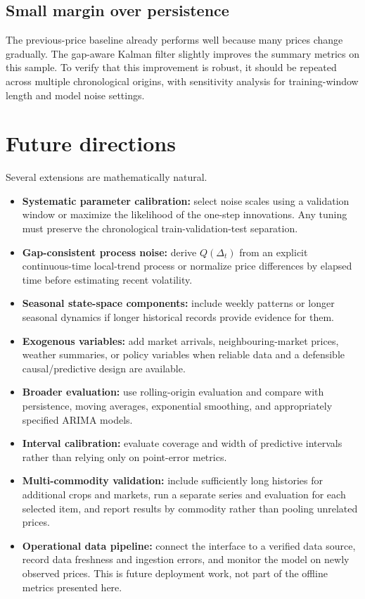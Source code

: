 \documentclass[12pt,a4paper,oneside]{report}
\numberwithin{equation}{chapter}
\numberwithin{figure}{chapter}
\numberwithin{table}{chapter}
\theoremstyle{definition}
\theoremstyle{plain}
\newcommand{\1}{\mathbf{1}}
\begin{document}
\subsection{Small margin over persistence}
The previous-price baseline already performs well because many prices change gradually. The gap-aware Kalman filter slightly improves the summary metrics on this sample. To verify that this improvement is robust, it should be repeated across multiple chronological origins, with sensitivity analysis for training-window length and model noise settings.

\section{Future directions}
Several extensions are mathematically natural.
\begin{itemize}
  \item \textbf{Systematic parameter calibration:} select noise scales using a validation window or maximize the likelihood of the one-step innovations. Any tuning must preserve the chronological train-validation-test separation.
  \item \textbf{Gap-consistent process noise:} derive $Q(\Delta_t)$ from an explicit continuous-time local-trend process or normalize price differences by elapsed time before estimating recent volatility.
  \item \textbf{Seasonal state-space components:} include weekly patterns or longer seasonal dynamics if longer historical records provide evidence for them.
  \item \textbf{Exogenous variables:} add market arrivals, neighbouring-market prices, weather summaries, or policy variables when reliable data and a defensible causal/predictive design are available.
  \item \textbf{Broader evaluation:} use rolling-origin evaluation and compare with persistence, moving averages, exponential smoothing, and appropriately specified ARIMA models.
  \item \textbf{Interval calibration:} evaluate coverage and width of predictive intervals rather than relying only on point-error metrics.
  \item \textbf{Multi-commodity validation:} include sufficiently long histories for additional crops and markets, run a separate series and evaluation for each selected item, and report results by commodity rather than pooling unrelated prices.
  \item \textbf{Operational data pipeline:} connect the interface to a verified data source, record data freshness and ingestion errors, and monitor the model on newly observed prices. This is future deployment work, not part of the offline metrics presented here.
\end{itemize}
\end{document}
